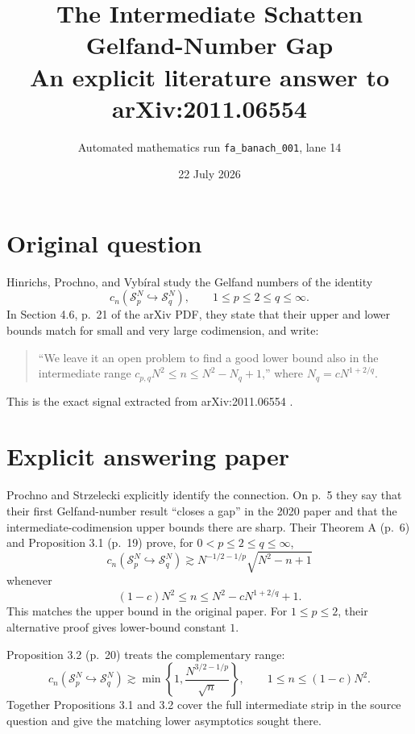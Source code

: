 \documentclass[11pt]{article}
\title{The Intermediate Schatten Gelfand-Number Gap\\
\large An explicit literature answer to arXiv:2011.06554}
\author{Automated mathematics run \texttt{fa\_banach\_001}, lane 14}
\date{22 July 2026}
\newcommand{\Sc}{\mathcal S}
\begin{document}
\maketitle

\begin{center}
\end{center}

\section*{Original question}

Hinrichs, Prochno, and Vyb\'iral study the Gelfand numbers of the identity
\[
 c_n(\Sc_p^N\hookrightarrow\Sc_q^N),
 \qquad 1\leq p\leq2\leq q\leq\infty.
\]
In Section 4.6, p.~21 of the arXiv PDF, they state that their upper and lower
bounds match for small and very large codimension, and write:

\begin{quote}
``We leave it an open problem to find a good lower bound also in the
intermediate range
$c_{p,q}N^2\leq n\leq N^2-N_q+1$,'' where
$N_q=cN^{1+2/q}$.
\end{quote}

This is the exact signal extracted from arXiv:2011.06554 \cite{HPV}.

\section*{Explicit answering paper}

Prochno and Strzelecki \cite{PS} explicitly identify the connection. On p.~5
they say that their first Gelfand-number result ``closes a gap'' in the 2020
paper and that the intermediate-codimension upper bounds there are sharp.
Their Theorem A (p.~6) and Proposition 3.1 (p.~19) prove, for
$0<p\leq2\leq q\leq\infty$,
\[
 c_n(\Sc_p^N\hookrightarrow\Sc_q^N)
 \gtrsim N^{-1/2-1/p}\sqrt{N^2-n+1}
\]
whenever
\[
 (1-c)N^2\leq n\leq N^2-cN^{1+2/q}+1.
\]
This matches the upper bound in the original paper. For
$1\leq p\leq2$, their alternative proof gives lower-bound constant $1$.

Proposition 3.2 (p.~20) treats the complementary range:
\[
 c_n(\Sc_p^N\hookrightarrow\Sc_q^N)
 \gtrsim
 \min\left\{1,\frac{N^{3/2-1/p}}{\sqrt n}\right\},
 \qquad 1\leq n\leq(1-c)N^2.
\]
Together Propositions 3.1 and 3.2 cover the full intermediate strip in the
source question and give the matching lower asymptotics sought there.
\end{document}
